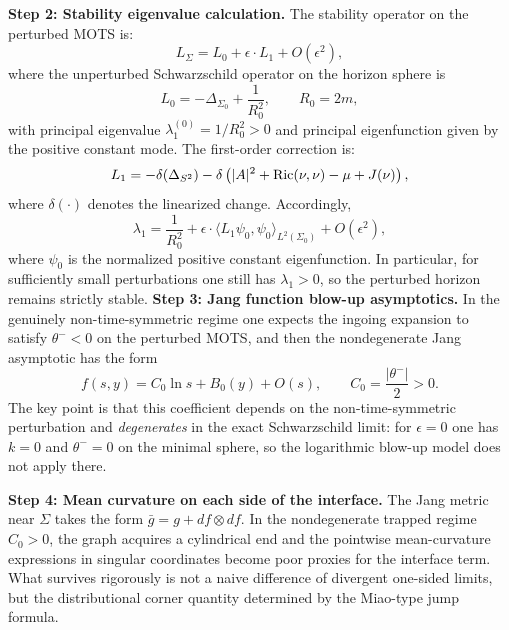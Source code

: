 \begin{example}
\textbf{Step 2: Stability eigenvalue calculation.}
The stability operator on the perturbed MOTS is:
\begin{equation}
    L_\Sigma = L_0 + \epsilon \cdot L_1 + O(\epsilon^2),
\end{equation}
where the unperturbed Schwarzschild operator on the horizon sphere is
\begin{equation}
    L_0 = -\Delta_{\Sigma_0} + \frac{1}{R_0^2}, \qquad R_0 = 2m,
\end{equation}
with principal eigenvalue $\lambda_1^{(0)} = 1/R_0^2 > 0$ and principal eigenfunction given by the positive constant mode. The first-order correction is:
\begin{equation}
    L_1 = -\delta(\Delta_{S^2}) - \delta\left( |A|^2 + \mathrm{Ric}(\nu, \nu) - \mu + J(\nu) \right),
\end{equation}
where $\delta(\cdot)$ denotes the linearized change. Accordingly,
\begin{equation}
    \lambda_1 = \frac{1}{R_0^2} + \epsilon \cdot \langle L_1 \psi_0, \psi_0 \rangle_{L^2(\Sigma_0)} + O(\epsilon^2),
\end{equation}
where $\psi_0$ is the normalized positive constant eigenfunction. In particular, for sufficiently small perturbations one still has $\lambda_1 > 0$, so the perturbed horizon remains strictly stable.
\textbf{Step 3: Jang function blow-up asymptotics.}
In the genuinely non-time-symmetric regime one expects the ingoing expansion to satisfy $\theta^- < 0$ on the perturbed MOTS, and then the nondegenerate Jang asymptotic has the form
\begin{equation}
    f(s,y) = C_0 \ln s + B_0(y) + O(s), \qquad C_0 = \frac{|\theta^-|}{2} > 0.
\end{equation}
The key point is that this coefficient depends on the non-time-symmetric perturbation and \emph{degenerates} in the exact Schwarzschild limit: for $\epsilon=0$ one has $k=0$ and $\theta^- = 0$ on the minimal sphere, so the logarithmic blow-up model does not apply there.

\textbf{Step 4: Mean curvature on each side of the interface.}
The Jang metric near $\Sigma$ takes the form $\bar{g} = g + df \otimes df$. In the nondegenerate trapped regime $C_0>0$, the graph acquires a cylindrical end and the pointwise mean-curvature expressions in singular coordinates become poor proxies for the interface term. What survives rigorously is not a naive difference of divergent one-sided limits, but the distributional corner quantity determined by the Miao-type jump formula.


\end{example}
